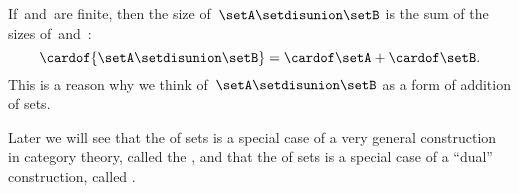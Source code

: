 \begin{remark}
    If~\setA and~\setB are finite, then the size of~$\setA \setdisunion \setB$ is the sum of the sizes of~\setA and~\setB:
    \begin{equation}
        \cardof{ \setA \setdisunion \setB} = \cardof \setA + \cardof \setB.
    \end{equation}
    This is a reason why we think of~$\setA \setdisunion \setB$ as a form of addition of sets.
\end{remark}

\begin{remark}
    Later we will see that the  of sets is a special case of a very general construction in category theory, called the , and that the  of sets is a special case of a ``dual'' construction, called .
\end{remark}

